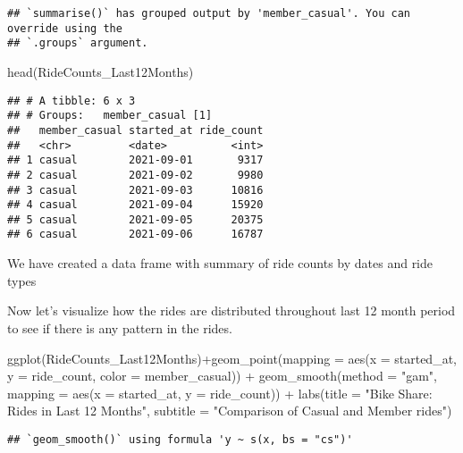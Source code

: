 \documentclass[
]{article}
\newenvironment{Shaded}{\begin{snugshade}}{\end{snugshade}}
\newcommand{\AttributeTok}[1]{\textcolor[rgb]{0.77,0.63,0.00}{#1}}
\newcommand{\FunctionTok}[1]{\textcolor[rgb]{0.00,0.00,0.00}{#1}}
\newcommand{\NormalTok}[1]{#1}
\newcommand{\SpecialCharTok}[1]{\textcolor[rgb]{0.00,0.00,0.00}{#1}}
\newcommand{\StringTok}[1]{\textcolor[rgb]{0.31,0.60,0.02}{#1}}
\begin{document}
\begin{verbatim}
## `summarise()` has grouped output by 'member_casual'. You can override using the
## `.groups` argument.
\end{verbatim}

\begin{Shaded}
\begin{Highlighting}[]
\FunctionTok{head}\NormalTok{(RideCounts\_Last12Months)}
\end{Highlighting}
\end{Shaded}

\begin{verbatim}
## # A tibble: 6 x 3
## # Groups:   member_casual [1]
##   member_casual started_at ride_count
##   <chr>         <date>          <int>
## 1 casual        2021-09-01       9317
## 2 casual        2021-09-02       9980
## 3 casual        2021-09-03      10816
## 4 casual        2021-09-04      15920
## 5 casual        2021-09-05      20375
## 6 casual        2021-09-06      16787
\end{verbatim}

We have created a data frame with summary of ride counts by dates and
ride types

Now let's visualize how the rides are distributed throughout last 12
month period to see if there is any pattern in the rides.

\begin{Shaded}
\begin{Highlighting}[]
\FunctionTok{ggplot}\NormalTok{(RideCounts\_Last12Months)}\SpecialCharTok{+}\FunctionTok{geom\_point}\NormalTok{(}\AttributeTok{mapping =} \FunctionTok{aes}\NormalTok{(}\AttributeTok{x =}\NormalTok{ started\_at, }\AttributeTok{y =}\NormalTok{ ride\_count, }\AttributeTok{color =}\NormalTok{ member\_casual)) }\SpecialCharTok{+} \FunctionTok{geom\_smooth}\NormalTok{(}\AttributeTok{method =} \StringTok{"gam"}\NormalTok{, }\AttributeTok{mapping =} \FunctionTok{aes}\NormalTok{(}\AttributeTok{x =}\NormalTok{ started\_at, }\AttributeTok{y =}\NormalTok{ ride\_count)) }\SpecialCharTok{+} \FunctionTok{labs}\NormalTok{(}\AttributeTok{title =} \StringTok{"Bike Share: Rides in Last 12 Months"}\NormalTok{, }\AttributeTok{subtitle =} \StringTok{"Comparison of Casual and Member rides"}\NormalTok{)  }
\end{Highlighting}
\end{Shaded}

\begin{verbatim}
## `geom_smooth()` using formula 'y ~ s(x, bs = "cs")'
\end{verbatim}
\end{document}
